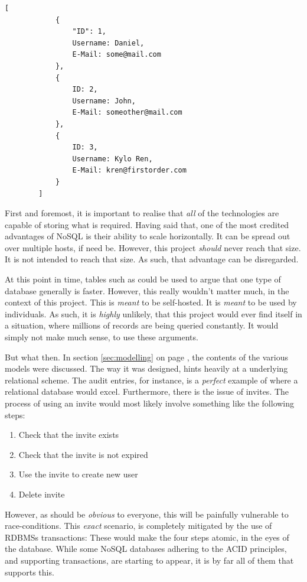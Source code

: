 		\begin{lstlisting}[style=json2,gobble=8, caption={NoSQL table example},label={lst:example:nosql}]
        [
            {
                "ID": 1,
                Username: Daniel,
                E-Mail: some@mail.com
            },
            {
                ID: 2,
                Username: John,
                E-Mail: someother@mail.com
            },
            {
                ID: 3,
                Username: Kylo Ren,
                E-Mail: kren@firstorder.com
            }
        ]
		\end{lstlisting}

		First and foremost, it is important to realise that \emph{all} of the technologies are capable of storing what is required. Having said that, one of the most credited advantages of NoSQL is their ability to scale horizontally. It can be spread out over multiple hosts, if need be. However, this project \emph{should} never reach that size. It is not intended to reach that size. As such, that advantage can be disregarded.

		At this point in time, tables such as \cite{db_rankings} could be used to argue that one type of database generally is faster. However, this really wouldn't matter much, in the context of this project. This is \emph{meant} to be self-hosted. It is \emph{meant} to be used by individuals. As such, it is \emph{highly} unlikely, that this project would ever find itself in a situation, where millions of records are being queried constantly. It would simply not make much sense, to use these arguments.

		But what then. In section \ref{sec:modelling} on page \pageref{sec:modelling}, the contents of the various models were discussed. The way it was designed, hints heavily at a underlying relational scheme. The audit entries, for instance, is a \emph{perfect} example of where a relational database would excel. Furthermore, there is the issue of invites. The process of using an invite would most likely involve something like the following steps:
		\begin{enumerate}
			\item Check that the invite exists
			\item Check that the invite is not expired
			\item Use the invite to create new user
			\item Delete invite
		\end{enumerate}
		However, as should be \emph{obvious} to everyone, this will be painfully vulnerable to race-conditions. This \emph{exact} scenario, is completely mitigated by the use of RDBMSs transactions: These would make the four steps atomic, in the eyes of the database. While some NoSQL databases adhering to the ACID principles, and supporting transactions, are starting to appear\cite{no_sql_transactions}, it is by far all of them that supports this.

